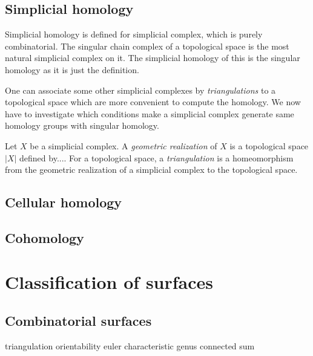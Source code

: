 \documentclass{../../large}
\begin{document}
\begin{prb}
\end{prb}


\section{Simplicial homology}

Simplicial homology is defined for simplicial complex, which is purely combinatorial.
The singular chain complex of a topological space is the most natural simplicial complex on it.
The simplicial homology of this is the singular homology as it is just the definition.

One can associate some other simplicial complexes by \emph{triangulations} to a topological space which are more convenient to compute the homology.
We now have to investigate which conditions make a simplicial complex generate same homology groups with singular homology.

Let $X$ be a simplicial complex.
A \emph{geometric realization} of $X$ is a topological space $|X|$ defined by....
For a topological space, a \emph{triangulation} is a homeomorphism from the geometric realization of a simplicial complex to the topological space.

\section{Cellular homology}

\section{Cohomology}




\chapter{Classification of surfaces}
\section{Combinatorial surfaces}

triangulation
orientability
euler characteristic
genus
connected sum
\end{document}
